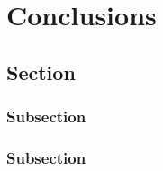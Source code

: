 



\chapter{Conclusions}  

\section{Section}
\noindent \lipsum[1][1-5] %


\noindent \lipsum[1][1-5] %


\subsection{Subsection}
\noindent \lipsum[1][1-5] %


\noindent \lipsum[1][1-5] %

\subsection{Subsection}
\noindent \lipsum[1][1-5] %


\noindent \lipsum[1][1-5] %




